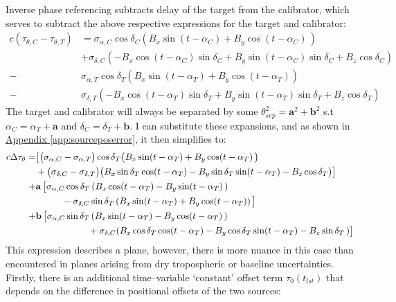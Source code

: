 		Inverse phase referencing subtracts delay of the target from the calibrator, which serves to subtract the above respective expressions for the target and calibrator:		
		\begin{equation}
			\begin{split}
				c\left(\tau_{\theta,C}-\tau_{\theta,T}\right) &= \sigma_{\alpha,C}\cos\delta_C(B_x\sin(t-\alpha_C)+B_y\cos(t-\alpha_C)\,)\\
				&+ \sigma_{\delta,C}(-B_x\cos(t-\alpha_C)\sin\delta_C+B_y\sin(t-\alpha_C)\sin\delta_C+B_z\cos\delta_C) \\
				-&  \sigma_{\alpha,T}\cos\delta_T\left(B_x\sin(t-\alpha_T)+B_y\cos(t-\alpha_T)\right)\\
				-& \sigma_{\delta,T}\left(-B_x\cos(t-\alpha_T)\sin\delta_T+B_y\sin(t-\alpha_T)\sin\delta_T+B_z\cos\delta_T\right) 
			\end{split}
		\end{equation}
		The target and calibrator will always be separated by some $\theta_{sep}^2=\textbf{a}^2+\textbf{b}^2$ s.t $\alpha_C=\alpha_T+\textbf{a}$ and $\delta_C=\delta_T+\textbf{b}$. I can substitute these expansions, and as shown in \hyperref[app:sourceposerror]{Appendix \ref*{app:sourceposerror}}, it then simplifies to:
		\begin{equation}
			\begin{split}
				c\Delta\tau_\theta =& \big[\big(\sigma_{\alpha,C} - \sigma_{\alpha,T}\big)\cos\delta_T\big(B_x\sin(t-\alpha_T)+B_y\cos(t-\alpha_T)\,\big) \\
				&+\big(\sigma_{\delta,C} - \sigma_{\delta,T}\big)\big(B_x\sin\delta_T\cos(t-\alpha_T)-B_y\sin\delta_T\sin(t-\alpha_T)-B_z\cos\delta_T\big)\big] \\\vspace{0.5cm}
				+& {\bf a}\, \big[\sigma_{\alpha,C}\cos\delta_T \left(B_x \cos(t-\alpha_T)-B_y\sin(t-\alpha_T)\,\right) \\ 
				&\hspace{1cm}-\sigma_{\delta,C}\sin\delta_T\left(B_x\sin(t-\alpha_T)+ B_y\cos(t-\alpha_T)\right)\big] \\\vspace{1cm}
				+& {\bf b}\, \big[\sigma_{\alpha,C}\sin\delta_T \left(B_x \sin(t-\alpha_T)-B_y\cos(t-\alpha_T)\,\right) \\ 
				&\hspace{2cm}+\sigma_{\delta,C}(B_x\cos\delta_T\cos(t-\alpha_T)- B_y\cos\delta_T\sin(t-\alpha_T)-B_z\sin\delta_T\,)\big] \\ 
			\end{split}
		\end{equation} This expression describes a plane, however, there is more nuance in this case than encountered in planes arising from dry tropospheric or baseline uncertainties. Firstly, there is an additional time--variable `constant' offset term $\tau_0(t_{lst})$ that depends on the difference in positional offsets of the two sources:
